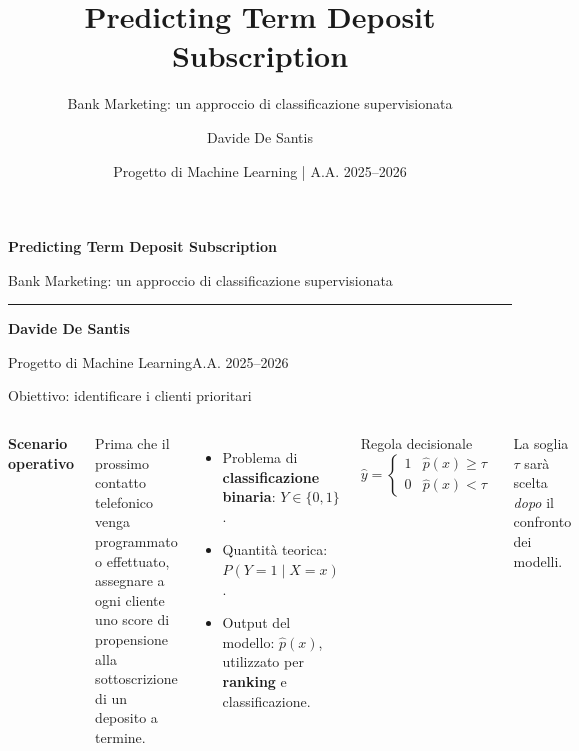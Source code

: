 \documentclass[10pt,aspectratio=169]{beamer}
\title{Predicting Term Deposit Subscription}
\subtitle{Bank Marketing: un approccio di classificazione supervisionata}
\author{Davide De Santis}
\date{Progetto di Machine Learning \;|\; A.A. 2025--2026}
\newcommand{\tightitems}{\setlength{\itemsep}{.5em}}
\begin{document}
\begin{frame}[plain]
\vspace*{.55cm}
{\LARGE\bfseries\color{deepnavy}Predicting Term Deposit Subscription}\par\vspace{.45em}
{\large\color{softgray}Bank Marketing: un approccio di classificazione supervisionata}\par\vspace{1.0cm}
{\color{teal}\rule{.91\linewidth}{1.2pt}}\par
\vfill
{\normalsize\bfseries Davide De Santis}\par\vspace{.24em}
{\small Progetto di Machine Learning\quad A.A. 2025--2026}\par\vspace{.5cm}
\end{frame}

\begin{frame}{Obiettivo: identificare i clienti prioritari}
\begin{columns}[T,onlytextwidth]
\textbf{Scenario operativo}\par\medskip
Prima che il prossimo contatto telefonico venga programmato o effettuato, assegnare a ogni cliente uno \alert{score di propensione} alla sottoscrizione di un deposito a termine.
\vspace{1em}
\begin{itemize}\tightitems
\item Problema di \textbf{classificazione binaria}: $Y\in\{0,1\}$.
\item Quantità teorica: $P(Y=1\mid X=x)$.
\item Output del modello: $\hat p(x)$, utilizzato per \textbf{ranking} e classificazione.
\end{itemize}
\begin{block}{Regola decisionale}
\vspace{-.6em}
\[\hat y=\begin{cases}1&\hat p(x)\geq\tau\\0&\hat p(x)<\tau\end{cases}\]
\vspace{-.5em}
\end{block}
\vspace{.8em}
{\small La soglia $\tau$ sarà scelta \emph{dopo} il confronto dei modelli.}
\end{columns}
\end{frame}
\end{document}
